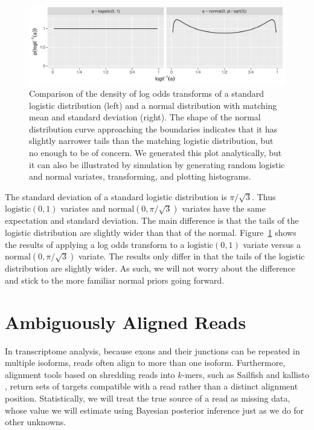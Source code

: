 \documentclass[11pt]{report}
\newcommand{\mycaption}[2]{\caption{#2}\label{#1}}
\begin{document}
\begin{figure}[t]
  \centering
  \includegraphics[width=\textwidth]{../../img/ilogit-logistic-vs-normal.pdf}
  \mycaption{fig:logistic-vs-normal}{Comparison of the density of log
    odds transforms of a standard logistic distribution (left) and a
    normal distribution with matching mean and standard deviation
    (right).  The shape of the normal distribution curve approaching
    the boundaries indicates that it has slightly narrower tails than
    the matching logistic distribution, but no enough to be of
    concern.  We generated this plot analytically, but it can also be
    illustrated by simulation by generating random logistic and normal
    variates, transforming, and plotting histograms.}
\end{figure}
%
The standard deviation of a standard logistic distribution is $\pi /
\sqrt{3}$.  Thus $\textrm{logistic}(0, 1)$ variates and
$\textrm{normal}(0, \pi / \sqrt{3})$ variates have the same
expectation and standard deviation.  The main difference is that the
tails of the logistic distribution are slightly wider than that of the
normal.  Figure~\ref{fig:logistic-vs-normal} shows the results of
applying a log odds transform to a $\textrm{logistic}(0, 1)$ variate
versus a $\textrm{normal}(0, \pi / \sqrt{3})$ variate.  The results
only differ in that the tails of the logistic distribution are
slightly wider.  As such, we will not worry about the difference and
stick to the more familiar normal priors going forward.


\chapter{Ambiguously Aligned Reads}

In transcriptome analysis, because exons and their junctions can be
repeated in multiple isoforms, reads often align to more than one
isoform.  Furthermore, alignment tools based on shredding reads into
$k$-mers, such as Sailfish \citep{patro2014sailfish} and kallisto
\citep{bray2016near}, return sets of targets compatible with a read
rather than a distinct alignment position.  Statistically, we will
treat the true source of a read as missing data, whose value we will
estimate using Bayesian posterior inference just as we do for other
unknowns. 
\end{document}

